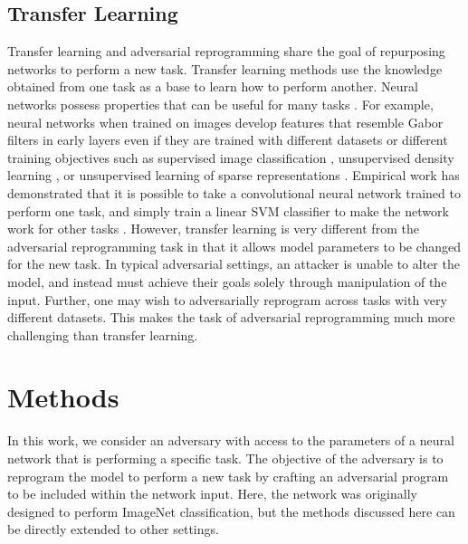 \documentclass{article}
\begin{document}
\subsection{Transfer Learning}

Transfer learning \citep{raina2007self, mesnil2011unsupervised} and adversarial reprogramming share the goal of repurposing networks to perform a new task. 
Transfer learning methods use the knowledge obtained from one task as a base to learn how to perform another. Neural networks possess properties that can be useful for many tasks \citep{yosinski2014transferable}. For example, neural networks when trained on images develop features that resemble Gabor filters in early layers even if they are trained with different datasets or different training objectives such as supervised image classification \citep{krizhevsky2012imagenet}, unsupervised density learning \citep{lee2009convolutional}, or unsupervised learning of sparse representations \citep{le2011ica}. Empirical work has demonstrated that it is possible to take a convolutional neural network trained to perform one task, and simply train a linear SVM classifier to make the network work for other tasks \citep{razavian2014cnn, donahue2014decaf}. 
However, transfer learning is very different from the adversarial reprogramming task in that it allows model parameters to be changed for the new task. In typical adversarial settings, an attacker is unable to alter the model, and instead must achieve their goals solely through manipulation of the input. Further, one may wish to adversarially reprogram across tasks with very different datasets. This makes the task of adversarial reprogramming much more challenging than transfer learning. 

\section{Methods}\label{sec method}

In this work, we consider an adversary with access to the parameters of a neural network that is performing a specific task. The objective of the adversary is to reprogram the model to perform a new task by crafting an adversarial program to be included within the network input. Here, the network was originally designed to perform ImageNet classification, but the methods discussed here can be directly extended to other settings.
\end{document}
